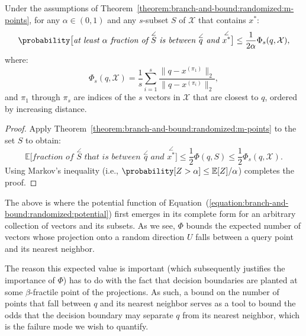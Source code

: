 \begin{corollary}
    \label{corollary:branch-and-bound:randomized:m-points}
    Under the assumptions of Theorem~\ref{theorem:branch-and-bound:randomized:m-points}, for any $\alpha \in (0, 1)$
    and any $s$-subset $S$ of $\mathcal{X}$ that contains $x^\ast$:
    \begin{equation*}
        \probability\big[ \textit{at least $\alpha$ fraction of $\overset{\angle}{S}$ is between
        $\overset{\angle}{q}$ and $\overset{\angle}{x^\ast}$} \big] \leq \frac{1}{2\alpha} \Phi_s(q, \mathcal{X}),
    \end{equation*}
    where:
    \begin{equation*}
        \Phi_s(q, \mathcal{X}) = \frac{1}{s} \sum_{i=1}^{s}
    \frac{\lVert q - x^{(\pi_1)} \rVert_2}{\lVert q - x^{(\pi_i)} \rVert_2},
    \end{equation*}
    and $\pi_1$ through $\pi_s$ are indices of the $s$ vectors in $\mathcal{X}$ that are closest to $q$, ordered
    by increasing distance.
\end{corollary}
\begin{proof}
    Apply Theorem~\ref{theorem:branch-and-bound:randomized:m-points} to the set $S$ to obtain:
    \begin{equation*}
        \mathbb{E}\big[ \textit{fraction of $\overset{\angle}{S}$ that is between
        $\overset{\angle}{q}$ and $\overset{\angle}{x^\ast}$} \big] \leq \frac{1}{2} \Phi(q, S) \leq \frac{1}{2} \Phi_s(q, \mathcal{X}).
    \end{equation*}
    Using Markov's inequality (i.e., $\probability[Z > \alpha] \leq \mathbb{E}[Z]/\alpha$) completes the proof.
\end{proof}

The above is where the potential function of Equation~(\ref{equation:branch-and-bound:randomized:potential}) first emerges
in its complete form for an arbitrary collection of vectors and its subsets.
As we see, $\Phi$ bounds the expected number of vectors whose projection onto
a random direction $U$ falls between a query point and its nearest neighbor.

\begin{svgraybox}
The reason this expected value is important (which subsequently justifies the importance of
$\Phi$) has to do with the fact that decision boundaries are planted at some $\beta$-fractile point of
the projections. As such, a bound on the number of points that fall between
$q$ and its nearest neighbor serves as a tool to bound the odds that the decision boundary may separate $q$ from
its nearest neighbor, which is the failure mode we wish to quantify.
\end{svgraybox}

